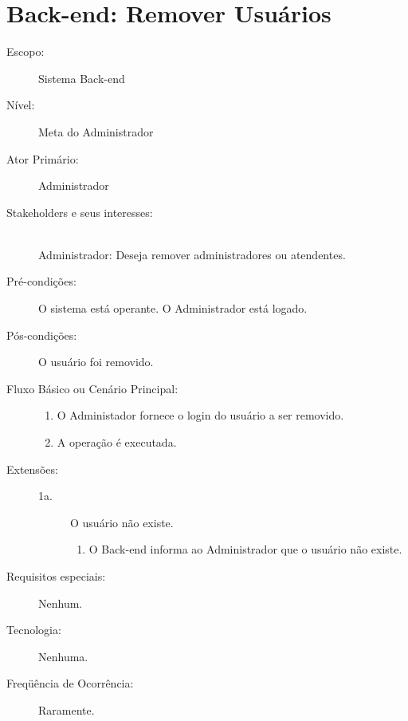 \documentclass[brazil,times]{abnt}
\begin{document}
\section{Back-end: Remover Usuários}
\begin{description}
\item[Escopo:] Sistema Back-end
\item[Nível:] Meta do Administrador
\item[Ator Primário:] Administrador
\item[Stakeholders e seus interesses:] \hfill \\
Administrador: Deseja remover administradores ou atendentes.

\item[Pré-condições:] O sistema está operante. O Administrador está logado.
\item[Pós-condições:] O usuário foi removido.
\item[Fluxo Básico ou Cenário Principal:]\hfill
\begin{enumerate}
  \item O Administador fornece o login do usuário a ser removido.
  \item A operação é executada.
\end{enumerate}

\item[Extensões:]\hfill
\begin{description}
	\item[1a.] O usuário não existe.
	\begin{enumerate}
 		\item O Back-end informa ao Administrador que o usuário não existe.
	\end{enumerate}

\end{description}
\item[Requisitos especiais:] Nenhum.
\item[Tecnologia:] Nenhuma.
\item[Freqüência de Ocorrência:] Raramente.

\end{description}
\end{document}
